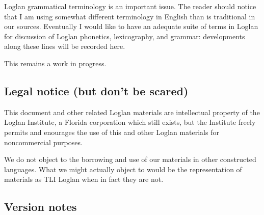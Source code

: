 \documentclass[12pt]{book}
\begin{document}
Loglan grammatical terminology is an important issue.  The reader should notice that I am using somewhat different terminology in English than is traditional in our sources.  Eventually I would like to have an adequate suite of terms in Loglan for discussion of Loglan phonetics, lexicography, and grammar:  developments along these lines will be recorded here.

This remains a work in progress.

\subsection{Legal notice (but don't be scared)}

This document and other related Loglan materials are intellectual property of the Loglan Institute, a Florida corporation which still exists, but the Institute freely permits and enourages the use of this and other Loglan materials for noncommercial purposes.

We do not object to the borrowing and use of our materials in other constructed languages.  What we might actually object to would be the representation of materials as TLI Loglan when in fact they are not.

\subsection{Version notes}
\end{document}

